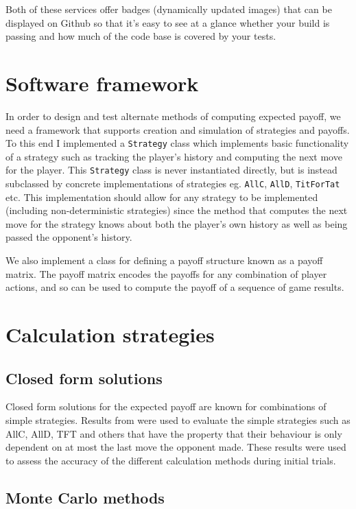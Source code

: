 \documentclass[a4paper,12pt]{article}
\begin{document}
Both of these services offer badges (dynamically updated images) that can be displayed on Github so that it's easy to see at a glance whether your build is passing and how much of the code base is covered by your tests.

\section{Software framework}

In order to design and test alternate methods of computing expected payoff, we need a framework that supports creation and simulation of strategies and payoffs.
To this end I implemented a \texttt{Strategy} class which implements basic functionality of a strategy such as tracking the player's history and computing the next move for the player.
This \texttt{Strategy} class is never instantiated directly, but is instead subclassed by concrete implementations of strategies eg. \texttt{AllC}, \texttt{AllD}, \texttt{TitForTat} etc.
This implementation should allow for any strategy to be implemented (including non-deterministic strategies) since the method that computes the next move for the strategy knows about both the player's own history as well as being passed the opponent's history.

We also implement a class for defining a payoff structure known as a payoff matrix.
The payoff matrix encodes the payoffs for any combination of player actions, and so can be used to compute the payoff of a sequence of game results.

\section{Calculation strategies}

\subsection{Closed form solutions}

Closed form solutions for the expected payoff are known for combinations of simple strategies.
Results from \cite{garciaandtraulsen} were used to evaluate the simple strategies such as AllC, AllD, TFT and others that have the property that their behaviour is only dependent on at most the last move the opponent made.
These results were used to assess the accuracy of the different calculation methods during initial trials.

\subsection{Monte Carlo methods}
\end{document}

